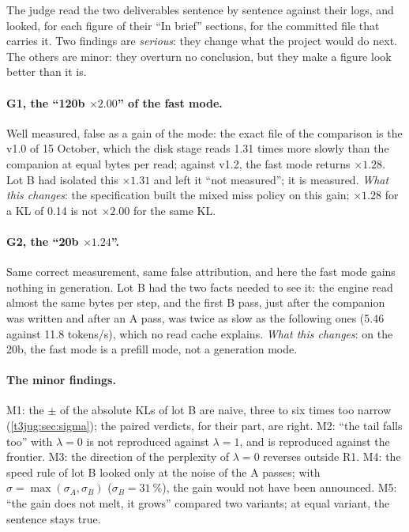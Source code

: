 The judge read the two deliverables sentence by sentence against their logs, and looked, for each figure of their ``In brief'' sections, for the committed file that carries it. Two findings are \emph{serious}: they change what the project would do next. The others are minor: they overturn no conclusion, but they make a figure look better than it is.

\paragraph{G1, the ``120b $\times 2.00$'' of the fast mode.} Well measured, false as a gain of the mode: the exact file of the comparison is the v1.0 of 15 October, which the disk stage reads 1.31 times more slowly than the companion at equal bytes per read; against v1.2, the fast mode returns $\times 1.28$. Lot B had isolated this $\times 1.31$ and left it ``not measured''; it is measured. \emph{What this changes}: the specification built the mixed miss policy on this gain; $\times 1.28$ for a KL of \num{0.14} is not $\times 2.00$ for the same KL.

\paragraph{G2, the ``20b $\times 1.24$''.} Same correct measurement, same false attribution, and here the fast mode gains nothing in generation. Lot B had the two facts needed to see it: the engine read almost the same bytes per step, and the first B pass, just after the companion was written and after an A pass, was twice as slow as the following ones (\num{5.46} against \num{11.8} tokens/s), which no read cache explains. \emph{What this changes}: on the 20b, the fast mode is a prefill mode, not a generation mode.

\paragraph{The minor findings.} M1: the $\pm$ of the absolute KLs of lot B are naive, three to six times too narrow (\cref{t3jug:sec:sigma}); the paired verdicts, for their part, are right. M2: ``the tail falls too'' with $\lambda = 0$ is not reproduced against $\lambda = 1$, and is reproduced against the frontier. M3: the direction of the perplexity of $\lambda = 0$ reverses outside R1. M4: the speed rule of lot B looked only at the noise of the A passes; with $\sigma = \max(\sigma_A, \sigma_B)$ ($\sigma_B = \SI{31}{\percent}$), the gain would not have been announced. M5: ``the gain does not melt, it grows'' compared two variants; at equal variant, the sentence stays true.

